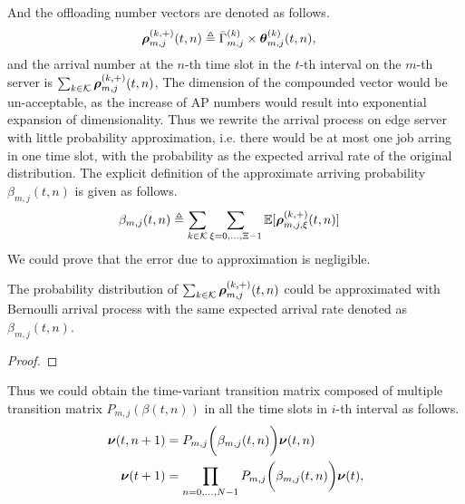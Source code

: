 And the offloading number vectors are denoted as follows.
\begin{align}
    \boldsymbol{\rho}^{(k,+)}_{m,j}({t,n}) &\triangleq \bar{\Gamma}^{(k)}_{m,j} \times \boldsymbol{\theta}^{(k)}_{m,j}({t,n}),
\end{align}
and the arrival number at the $n$-th time slot in the $t$-th interval on the $m$-th server is $\sum_{k\in\mathcal{K}} \boldsymbol{\rho}^{(k,+)}_{m,j}({t,n})$,
The dimension of the compounded vector would be un-acceptable, as the increase of AP numbers would result into exponential expansion of dimensionality.
Thus we rewrite the arrival process on edge server with little probability approximation, i.e. there would be at most one job arring in one time slot, with the probability as the expected arrival rate of the original distribution. The explicit definition of the approximate arriving probability $\beta_{m,j}({t,n})$ is given as follows.
\begin{align}
    {\beta}_{m,j}({t,n}) &\triangleq \sum_{k\in\mathcal{K}} \sum_{\xi=0,\dots,\Xi-1} \mathbb{E}[\boldsymbol{\rho}^{(k,+)}_{m,j,\xi}({t,n})]
    \label{eqn_0}
\end{align}
We could prove that the error due to approximation is negligible.
\begin{lemma}
    The probability distribution of $\sum_{k\in\mathcal{K}} \boldsymbol{\rho}^{(k,+)}_{m,j}({t,n})$ could be approximated with Bernoulli arrival process with the same expected arrival rate denoted as ${\beta}_{m,j}({t,n})$.
\end{lemma}
\begin{proof}
\end{proof}

Thus we could obtain the time-variant transition matrix composed of multiple transition matrix $P_{m,j}(\beta({t,n}))$ in all the time slots in $i$-th interval as follows.
\begin{align}
    \boldsymbol{\nu}({t,n+1}) &= P_{m,j}\bigg(\beta_{m,j}({t,n})\bigg) \boldsymbol{\nu}({t,n})
    \\
    \boldsymbol{\nu}({t+1}) &= \prod_{n=0,\dots,N-1} P_{m,j}\bigg(\beta_{m,j}({t,n})\bigg) \boldsymbol{\nu}({t}),
    \label{eqn_4}
\end{align}

